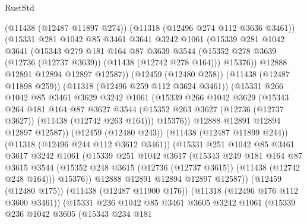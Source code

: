 \begin{lexlean}{RustStd}
\begin{coremodule}
              (@11438 (@12487 @11897 @274))
              (@11318 (@12496 @274 @112 @3636 @3461))
              (@15331
                @281
                @1042
                @85
                @3461
                @3641
                @3242
                @1061
                (@15339
                  @281
                  @1042
                  @3641
                  (@15343
                    @279
                    @181
                    @164
                    @87
                    @3639
                    @3544
                    (@15352 @278 @3639 (@12736 (@12737 @3639)) (@11438 (@12742 @278 @164)))
                    @15376))
                @12888
                @12891
                @12894
                @12897
                @12587))
            (@12459 (@12480 @258))
            (@11438 (@12487 @11898 @259))
            (@11318 (@12496 @259 @112 @3624 @3461))
            (@15331
              @266
              @1042
              @85
              @3461
              @3629
              @3242
              @1061
              (@15339
                @266
                @1042
                @3629
                (@15343
                  @264
                  @181
                  @164
                  @87
                  @3627
                  @3544
                  (@15352 @263 @3627 (@12736 (@12737 @3627)) (@11438 (@12742 @263 @164)))
                  @15376))
              @12888
              @12891
              @12894
              @12897
              @12587))
          (@12459 (@12480 @243))
          (@11438 (@12487 @11899 @244))
          (@11318 (@12496 @244 @112 @3612 @3461))
          (@15331
            @251
            @1042
            @85
            @3461
            @3617
            @3242
            @1061
            (@15339
              @251
              @1042
              @3617
              (@15343
                @249
                @181
                @164
                @87
                @3615
                @3544
                (@15352 @248 @3615 (@12736 (@12737 @3615)) (@11438 (@12742 @248 @164)))
                @15376))
            @12888
            @12891
            @12894
            @12897
            @12587))
        (@12459 (@12480 @175))
        (@11438 (@12487 @11900 @176))
        (@11318 (@12496 @176 @112 @3600 @3461))
        (@15331
          @236
          @1042
          @85
          @3461
          @3605
          @3242
          @1061
          (@15339
            @236
            @1042
            @3605
            (@15343
              @234
              @181

\end{coremodule}
\end{lexlean}

